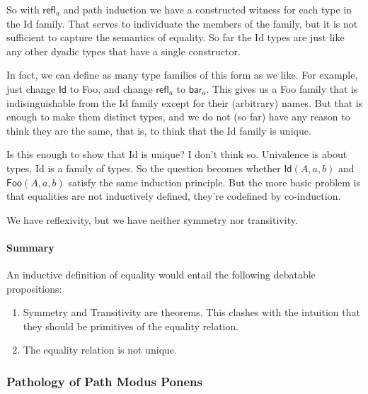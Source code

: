 \documentclass{article}
\begin{document}
So with \(\textsf{refl}_a\) and path induction we have a constructed
witness for each type in the \textsf{Id} family. That serves to
individuate the members of the family, but it is not sufficient to
capture the semantics of equality. So far the \textsf{Id} types are
just like any other dyadic types that have a single constructor.

In fact, we can define as many type families of this form as we like.
For example, just change \(\textsf{Id}\) to \textsf{Foo}, and change
\(\textsf{refl}_a\) to \(\textsf{bar}_a\). This gives us a
\textsf{Foo} family that is indisinguishable from the \textsf{Id}
family except for their (arbitrary) names. But that is enough to make
them distinct types, and we do not (so far) have any reason to think
they are the same, that is, to think that the \textsf{Id} family is
unique.


Is this enough to show that \textsf{Id} is unique? I don't think so.
Univalence is about types, \textsf{Id} is a family of types. So the
question becomes whether \(\textsf{Id}(A,a,b)\) and
\(\textsf{Foo}(A,a,b)\) satisfy the same induction principle. But the
more basic problem is that equalities are not inductively defined,
they're codefined by co-induction.

 We have reflexivity, but we have
neither symmetry nor transitivity.

\paragraph{Summary}
An inductive definition of equality would entail the following
debatable propositions:


\begin{enumerate}
\item Symmetry and Transitivity are theorems. This clashes with the
  intuition that they should be primitives of the equality relation.
\item The equality relation is not unique.
\end{enumerate}

\subsubsection{Pathology of Path Modus Ponens}
\end{document}
